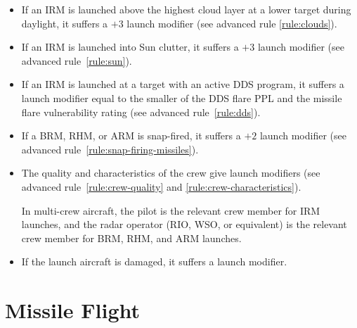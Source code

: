 {\begin{itemize}
    \item If an IRM is launched above the highest cloud layer at a lower target during daylight, it suffers a $+3$ launch modifier (see advanced rule \ref{rule:clouds}).

    \item If an IRM is launched into Sun clutter, it suffers a $+3$ launch modifier (see advanced rule~\ref{rule:sun}).

    \item If an IRM is launched at a target with an active DDS program, it suffers a launch modifier equal to the smaller of the DDS flare PPL and the missile flare vulnerability rating (see advanced rule~\ref{rule:dds}).

    \item If a BRM, RHM, or ARM is snap-fired, it suffers a $+2$ launch modifier (see advanced rule~\ref{rule:snap-firing-missiles}).
    
    \item The quality and characteristics of the crew give launch modifiers (see advanced rule~\ref{rule:crew-quality} and \ref{rule:crew-characteristics}). 
    
    In multi-crew aircraft, the pilot is the relevant crew member for IRM launches, and the radar operator (RIO, WSO, or equivalent) is the relevant crew member for BRM, RHM, and ARM launches.

    \item If the launch aircraft is damaged, it suffers a launch modifier.
    
\end{itemize}
}
\section{Missile Flight}
\label{rule:missile-flight}


